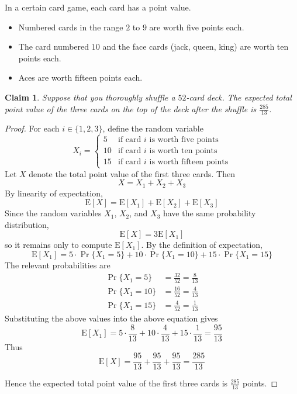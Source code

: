 \documentclass{article}
\newtheorem{claim}{Claim}
\begin{document}
In a certain card game, each card has a point value.

\begin{itemize}
    \item Numbered cards in the range $2$ to $9$ are worth five points each.
    \item The card numbered $10$ and the face cards (jack, queen, king) are worth ten points each.
    \item Aces are worth fifteen points each.
\end{itemize}

\begin{claim}
    Suppose that you thoroughly shuffle a $52$-card deck. The expected total point value of the three 
    cards on the top of the deck after the shuffle is $\frac{285}{13}$.
\end{claim}

\begin{proof}
    For each $i \in \{1, 2, 3\}$, define the random variable 
    \[
    X_i =
    \begin{cases}
        5 & \text{if card } i \text{ is worth five points} \\
        10 & \text{if card } i \text{ is worth ten points} \\
        15 & \text{if card } i \text{ is worth fifteen points}
    \end{cases}
    \]
    Let $X$ denote the total point value of the first three cards. Then
    \[
    X = X_1 + X_2 + X_3
    \]
    By linearity of expectation,
    \[
    \mathrm{E}[X] = \mathrm{E}[X_1] + \mathrm{E}[X_2] + \mathrm{E}[X_3]
    \]
    Since the random variables $X_1$, $X_2$, and $X_3$ have the same probability distribution, 
    \[
    \mathrm{E}[X] = 3\mathrm{E}[X_1]
    \]
    so it remains only to compute $\mathrm{E}[X_1]$. By the definition of expectation, 
    \[
    \mathrm{E}[X_1] = 5 \cdot \Pr\{X_1 = 5\} + 10 \cdot \Pr\{X_1 = 10\} + 15 \cdot \Pr\{X_1 = 15\}
    \]
    The relevant probabilities are
    \[
    \begin{aligned}
        \Pr\{X_1 = 5\} &= \frac{32}{52} = \frac{8}{13} \\[4pt]
        \Pr\{X_1 = 10\} &= \frac{16}{52} = \frac{4}{13} \\[4pt]
        \Pr\{X_1 = 15\} &= \frac{4}{52} = \frac{1}{13}
    \end{aligned}
    \]
    Substituting the above values into the above equation gives 
    \[
    \mathrm{E}[X_1] = 5 \cdot \frac{8}{13} + 10 \cdot \frac{4}{13} + 15 \cdot \frac{1}{13} = \frac{95}{13}
    \]
    Thus 
    \[
    \mathrm{E}[X] = \frac{95}{13} + \frac{95}{13} + \frac{95}{13} = \frac{285}{13}
    \]

    \medskip

    Hence the expected total point value of the first three cards is $\frac{285}{13}$ points.
\end{proof}
\end{document}

